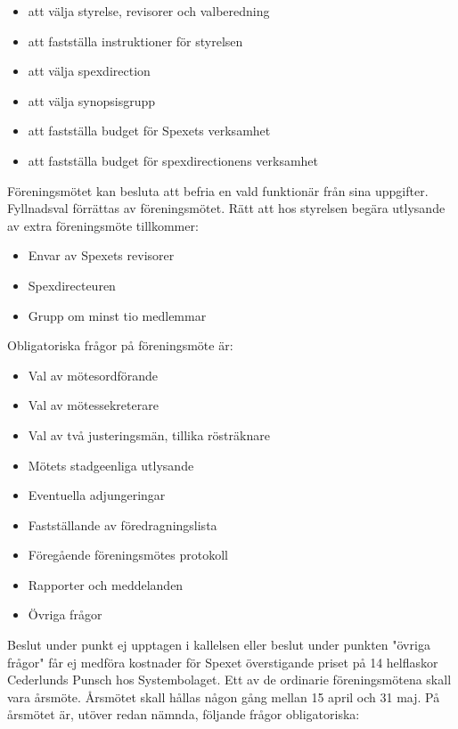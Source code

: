 \documentclass[a4paper]{article}
\begin{document}
\begin{itemize}
  \item att välja styrelse, revisorer och valberedning
  \item att fastställa instruktioner för styrelsen
  \item att välja spexdirection
  \item att välja synopsisgrupp
  \item att fastställa budget för Spexets verksamhet
  \item att fastställa budget för spexdirectionens verksamhet
\end{itemize}

\noindent
Föreningsmötet kan besluta att befria en vald funktionär från sina uppgifter. Fyllnadsval förrättas av föreningsmötet.\newline
\newline
Rätt att hos styrelsen begära utlysande av extra föreningsmöte tillkommer:

\begin{itemize}
  \item Envar av Spexets revisorer
  \item Spexdirecteuren
  \item Grupp om minst tio medlemmar
\end{itemize}

\noindent
Obligatoriska frågor på föreningsmöte är:

\begin{itemize}
  \item Val av mötesordförande
  \item Val av mötessekreterare
  \item Val av två justeringsmän, tillika rösträknare
  \item Mötets stadgeenliga utlysande
  \item Eventuella adjungeringar
  \item Fastställande av föredragningslista
  \item Föregående föreningsmötes protokoll
  \item Rapporter och meddelanden
  \item Övriga frågor
\end{itemize}

Beslut under punkt ej upptagen i kallelsen eller beslut under punkten "övriga frågor" får ej medföra kostnader för Spexet överstigande priset på 14 helflaskor Cederlunds Punsch hos Systembolaget.\newline
\newline
Ett av de ordinarie föreningsmötena skall vara årsmöte. Årsmötet skall hållas någon gång mellan 15 april och 31 maj.\newline
\newline
På årsmötet är, utöver redan nämnda, följande frågor obligatoriska:
\end{document}

